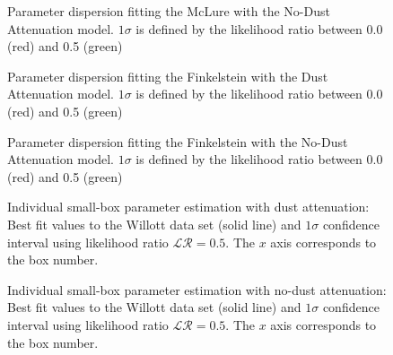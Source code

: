 \documentclass{emulateapj}
\begin{document}
\begin{figure}
\caption{Parameter dispersion fitting the McLure with the No-Dust Attenuation model. 
$1\sigma$ is defined by the likelihood ratio between 0.0 (red) and 0.5 (green)}
\label{fig:OD3_MCMC_best_steps_wo}
\end{figure}
\begin{figure}
\caption{Parameter dispersion fitting the Finkelstein with the Dust Attenuation model. 
$1\sigma$ is defined by the likelihood ratio between 0.0 (red) and 0.5 (green)}
\label{fig:OD4_MCMC_best_steps_w}
\end{figure}

\begin{figure}
\caption{Parameter dispersion fitting the Finkelstein with the No-Dust Attenuation model. 
$1\sigma$ is defined by the likelihood ratio between 0.0 (red) and 0.5 (green)}
\label{fig:OD4_MCMC_best_steps_wo}
\end{figure}


\begin{figure}
\caption{Individual small-box parameter estimation with dust attenuation: Best fit values 
to the Willott data set
(solid line) and $1\sigma$ confidence interval using likelihood ratio $\mathcal{LR}= 0.5$. 
The $x$ axis corresponds to the box number.}
\label{fig:OD1_individual_box_results_w}
\end{figure}


\begin{figure}
\caption{Individual small-box parameter estimation with no-dust attenuation: Best fit values 
to the Willott data set
(solid line) and $1\sigma$ confidence interval using likelihood ratio $\mathcal{LR}= 0.5$. 
The $x$ axis corresponds to the box number.}
\label{fig:OD1_individual_box_results_wo}
\end{figure}


\end{document}
